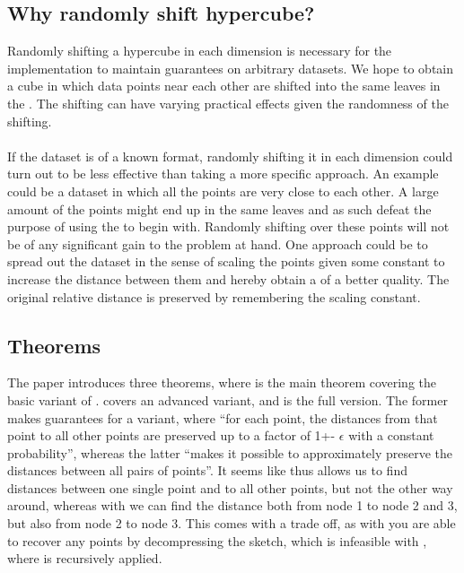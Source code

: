 \subsection{Why randomly shift hypercube?}
Randomly shifting a hypercube in each dimension is necessary for the \qs{} implementation to maintain guarantees on arbitrary datasets. We hope to obtain a cube in which data points near each other are shifted into the same leaves in the \qt{}. The shifting can have varying practical effects given the randomness of the shifting.
\\
\\
If the dataset is of a known format, randomly shifting it in each dimension could turn out to be less effective than taking a more specific approach. An example could be a dataset in which all the points are very close to each other. A large amount of the points might end up in the same leaves and as such defeat the purpose of using the \qt{} to begin with. Randomly shifting over these points will not be of any significant gain to the problem at hand. One approach could be to spread out the dataset in the sense of scaling the points given some constant to increase the distance between them and hereby obtain a \qt{} of a better quality. The original relative distance is preserved by remembering the scaling constant.

\subsection{Theorems}
The paper introduces three theorems, where  is the main theorem covering the basic variant of \qs{}.  covers an advanced variant, and  is the full version. The former makes guarantees for a \qs{} variant, where “for each point, the distances from that point to all other points are preserved up to a factor of 1+- $\epsilon$ with a constant probability”, whereas the latter “makes it possible to approximately preserve the distances between all pairs of points”. It seems like  thus allows us to find distances between one single point and to all other points, but not the other way around, whereas with  we can find the distance both from node 1 to node 2 and 3, but also from node 2 to node 3. This comes with a trade off, as with  you are able to recover any points by decompressing the sketch, which is infeasible with , where \qs{} is recursively applied.

